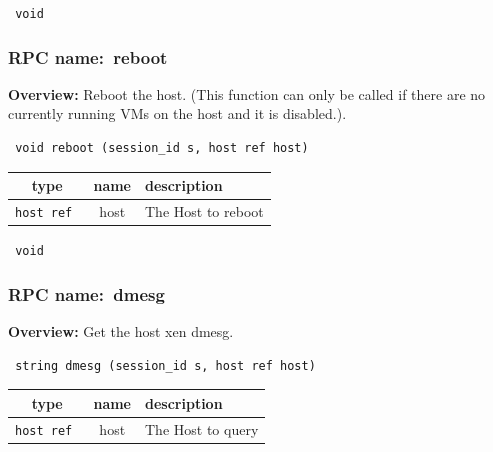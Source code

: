 \vspace{0.3cm}

{\tt 
void
}



\vspace{0.3cm}
\vspace{0.3cm}
\vspace{0.3cm}
\subsubsection{RPC name:~reboot}

{\bf Overview:} 
Reboot the host. (This function can only be called if there are no
currently running VMs on the host and it is disabled.).

\begin{verbatim} void reboot (session_id s, host ref host)\end{verbatim}



 
\vspace{0.3cm}
\begin{tabular}{|c|c|p{7cm}|}
 \hline
{\bf type} & {\bf name} & {\bf description} \\ \hline
{\tt host ref } & host & The Host to reboot \\ \hline 

\end{tabular}

\vspace{0.3cm}

{\tt 
void
}



\vspace{0.3cm}
\vspace{0.3cm}
\vspace{0.3cm}
\subsubsection{RPC name:~dmesg}

{\bf Overview:} 
Get the host xen dmesg.

\begin{verbatim} string dmesg (session_id s, host ref host)\end{verbatim}



 
\vspace{0.3cm}
\begin{tabular}{|c|c|p{7cm}|}
 \hline
{\bf type} & {\bf name} & {\bf description} \\ \hline
{\tt host ref } & host & The Host to query \\ \hline 

\end{tabular}

